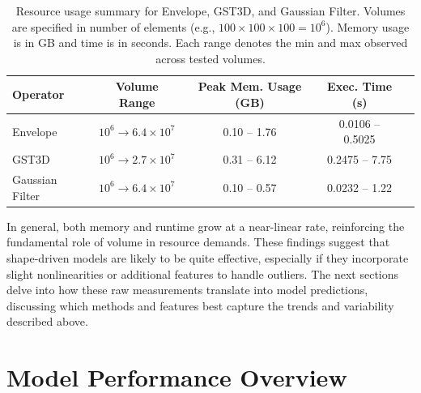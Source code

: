 \begin{table}[htbp]
    \centering
    \begin{tabular}{lcccc}
        \hline
        \textbf{Operator} & \textbf{Volume Range} & \textbf{Peak Mem. Usage (GB)} & \textbf{Exec. Time (s)} \\ \hline
        Envelope &
        $10^6 \!\to\! 6.4\times10^7$ &
        0.10 -- 1.76 &
        0.0106 -- 0.5025 \\
        \ac{GST3D} &
        $10^6 \!\to\! 2.7\times10^7$ &
        0.31 -- 6.12 &
        0.2475 -- 7.75 \\
        Gaussian Filter &
        $10^6 \!\to\! 6.4\times10^7$ &
        0.10 -- 0.57 &
        0.0232 -- 1.22 \\
        \hline
    \end{tabular}
    \caption{Resource usage summary for Envelope, \ac{GST3D}, and Gaussian Filter.
    Volumes are specified in number of elements (e.g., $100 \times 100 \times 100 = 10^6$).
    Memory usage is in GB and time is in seconds.
    Each range denotes the min and max observed across tested volumes.}
    \label{tab:operator_summary_aggregates}
\end{table}

In general, both memory and runtime grow at a near-linear rate, reinforcing the fundamental role of volume in resource demands.
These findings suggest that shape-driven models are likely to be quite effective, especially if they incorporate slight nonlinearities or additional features to handle outliers.
The next sections delve into how these raw measurements translate into model predictions, discussing which methods and features best capture the trends and variability described above.


\section{Model Performance Overview}
\label{sec:pmc-results-model-performance-overview}

